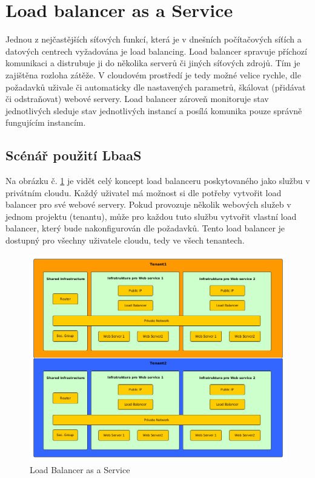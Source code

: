\section{Load balancer as a Service}

Jednou z nejčastějších síťových funkcí, která je v dnešních počítačových síťích a datových centrech vyžadována je load balancing. Load balancer spravuje příchozí komunikaci a distrubuje ji do několika serverů či jiných síťových zdrojů. Tím je zajištěna rozloha zátěže.  V cloudovém prostředí je tedy možné velice rychle, dle požadavků uživale či automaticky dle nastavených parametrů, škálovat (přidávat či odstraňovat) webové servery. Load balancer zároveň monitoruje stav jednotlivých sleduje stav jednotlivých instancí a posílá komunika pouze správně fungujícím instancím. 

\subsection{Scénář použití LbaaS}

Na obrázku č. \ref{fig:LoadBalancer} je vidět celý koncept load balanceru poskytovaného jako službu v privátním cloudu. Každý uživatel má možnost si dle potřeby vytvořit load balancer pro své webové servery. Pokud provozuje několik webových služeb v jednom projektu (tenantu), může pro každou tuto službu vytvořit vlastní load balancer, který bude nakonfigurován dle požadavků. Tento load balancer je dostupný pro všechny uživatele cloudu, tedy ve všech tenantech.

\begin{figure}[h]
\begin{centering}
\includegraphics[scale=0.43]{images/LoadBalancer}
\par\end{centering}
\caption{Load Balancer as a Service\label{fig:LoadBalancer}}
\end{figure}

